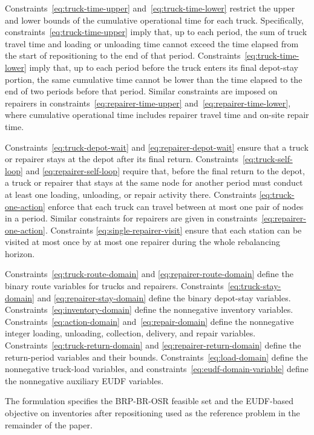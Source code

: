 Constraints~\eqref{eq:truck-time-upper} and~\eqref{eq:truck-time-lower}
restrict the upper and lower bounds of the cumulative operational time for each
truck. Specifically, constraints~\eqref{eq:truck-time-upper} imply that, up to
each period, the sum of truck travel time and loading or unloading time cannot
exceed the time elapsed from the start of repositioning to the end of that
period. Constraints~\eqref{eq:truck-time-lower} imply that, up to each period
before the truck enters its final depot-stay portion, the same cumulative time
cannot be lower than the time elapsed to the end of two periods before that
period. Similar constraints are imposed on repairers in
constraints~\eqref{eq:repairer-time-upper} and~\eqref{eq:repairer-time-lower},
where cumulative operational time includes repairer travel time and on-site
repair time.

Constraints~\eqref{eq:truck-depot-wait} and
\eqref{eq:repairer-depot-wait} ensure that a truck or repairer stays at the
depot after its final return. Constraints~\eqref{eq:truck-self-loop} and
\eqref{eq:repairer-self-loop} require that, before the final return to the
depot, a truck or repairer that stays at the same node for another period must
conduct at least one loading, unloading, or repair activity there. Constraints
\eqref{eq:truck-one-action} enforce that each truck can travel between at most
one pair of nodes in a period. Similar constraints for repairers are given in
constraints~\eqref{eq:repairer-one-action}. Constraints
\eqref{eq:single-repairer-visit} ensure that each station can be visited at most
once by at most one repairer during the whole rebalancing horizon.

Constraints~\eqref{eq:truck-route-domain} and
\eqref{eq:repairer-route-domain} define the binary route variables for trucks
and repairers. Constraints~\eqref{eq:truck-stay-domain} and
\eqref{eq:repairer-stay-domain} define the binary depot-stay variables.
Constraints~\eqref{eq:inventory-domain} define the nonnegative inventory
variables. Constraints~\eqref{eq:action-domain} and~\eqref{eq:repair-domain}
define the nonnegative integer loading, unloading, collection, delivery, and
repair variables. Constraints~\eqref{eq:truck-return-domain} and
\eqref{eq:repairer-return-domain} define the return-period variables and their
bounds. Constraints~\eqref{eq:load-domain} define the nonnegative truck-load
variables, and constraints~\eqref{eq:eudf-domain-variable} define the
nonnegative auxiliary EUDF variables.

The formulation specifies the BRP-BR-OSR feasible set and the EUDF-based
objective on inventories after repositioning used as the reference problem in the
remainder of the paper.

